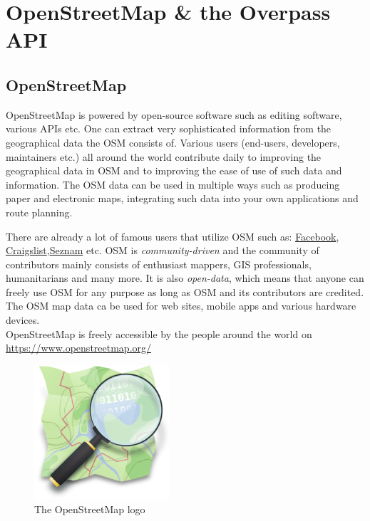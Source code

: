 \section{OpenStreetMap \& the Overpass API}
\subsection{OpenStreetMap}
OpenStreetMap is powered by open-source software such as editing software, various APIs etc.
One can extract very sophisticated information from the geographical data the OSM consists of.
Various users (end-users, developers, maintainers etc.) all around the world contribute daily to improving the geographical
data in OSM and to improving the ease of use of such data and information.
The OSM data can be used in multiple ways such as producing paper and electronic maps,
integrating such data into your own applications and route planning.\\
\newline

There are already a lot of famous users that utilize OSM such as:
\href{https://www.facebook.com/}{Facebook},
\href{https://www.craigslist.org/}{Craigslist},\href{https://www.seznam.cz/}{Seznam} etc.
OSM is \textit{community-driven} and the community of contributors mainly consists of enthusiast mappers,
GIS professionals, humanitarians and many more. It is also \textit{open-data}, which means that anyone can freely use
OSM for any purpose as long as OSM and its contributors are credited.
The OSM map data ca be used for web sites, mobile apps and various hardware devices.\\
\newline
OpenStreetMap is freely accessible by the people around the world on \href{https://www.openstreetmap.org/}{https://www.openstreetmap.org/}\\
\newline
\begin{figure}[H]
    \centering
    \includegraphics[width=5cm]{./Figures/Introduction/openstreetmap_logo.png}
    \caption{The OpenStreetMap logo}
\end{figure}
\pagebreak
